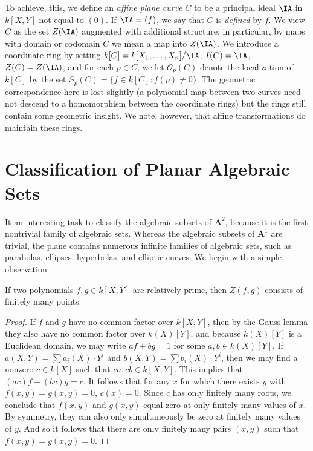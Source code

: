To achieve, this, we define an \emph{affine plane curve} $C$ to be a principal ideal $\IA$ in $k[X,Y]$ not equal to $(0)$. If $\IA = (f)$, we say that $C$ is \emph{defined} by $f$. We view $C$ as the set $Z(\IA)$ augmented with additional structure; in particular, by maps with domain or codomain $C$ we mean a map into $Z(\IA)$. We introduce a coordinate ring by setting $k[C] = k[X_1,\dots,X_n]/\IA$, $I(C) = \IA$, $Z(C) = Z(\IA)$, and for each $p \in C$, we let $\mathcal{O}_p(C)$ denote the localization of $k[C]$ by the set $S_p(C) = \{ f \in k[C] : f(p) \neq 0 \}$. The geometric correspondence here is lost slightly (a polynomial map between two curves need not descend to a homomorphism between the coordinate rings) but the rings still contain some geometric insight. We note, however, that affine transformations do maintain these rings.

\section{Classification of Planar Algebraic Sets}

It an interesting task to classify the algebraic subsets of $\mathbf{A}^2$, because it is the first nontrivial family of algebraic sets. Whereas the algebraic subsets of $\mathbf{A}^1$ are trivial, the plane contains numerous infinite families of algebraic sets, such as parabolas, ellipses, hyperbolas, and elliptic curves. We begin with a simple observation.

\begin{theorem}
    If two polynomials $f,g \in k[X,Y]$ are relatively prime, then $Z(f,g)$ consists of finitely many points.
\end{theorem}
\begin{proof}
    If $f$ and $g$ have no common factor over $k[X,Y]$, then by the Gauss lemma they also have no common factor over $k(X)[Y]$, and because $k(X)[Y]$ is a Euclidean domain, we may write $af + bg = 1$ for some $a,b \in k(X)[Y]$. If $a(X,Y) = \sum a_i(X) \cdot Y^i$ and $b(X,Y) = \sum b_i(X) \cdot Y^i$, then we may find a nonzero $c \in k[X]$ such that $ca, cb \in k[X,Y]$. This implies that $(ac)f + (bc)g = c$. It follows that for any $x$ for which there exists $y$ with $f(x,y) = g(x,y) = 0$, $c(x) = 0$. Since $c$ has only finitely many roots, we conclude that $f(x,y)$ and $g(x,y)$ equal zero at only finitely many values of $x$. By symmetry, they can also only simultaneously be zero at finitely many values of $y$. And so it follows that there are only finitely many pairs $(x,y)$ such that $f(x,y) = g(x,y) = 0$.
\end{proof}

